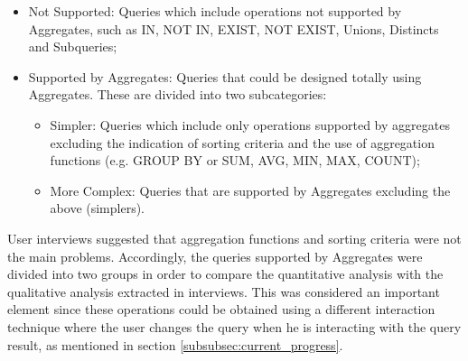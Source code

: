 \begin{itemize}
    \item Not Supported: Queries which include operations not supported by Aggregates, such as IN, NOT IN, EXIST, NOT EXIST, Unions, Distincts and Subqueries;
    \item Supported by Aggregates: Queries that could be designed totally using Aggregates. These are divided into two subcategories:
    \begin{itemize}
        \item Simpler: Queries which include only operations supported by aggregates excluding the indication of sorting criteria and the use of aggregation functions (e.g. GROUP BY or SUM, AVG, MIN, MAX, COUNT);
        \item More Complex: Queries that are supported by Aggregates excluding the above (simplers).
    \end{itemize}
\end{itemize}

User interviews suggested that aggregation functions and sorting criteria were not the main problems. Accordingly, the queries supported by Aggregates were divided into two groups in order to compare the quantitative analysis with the qualitative analysis extracted in interviews. This was considered an important element since these operations could be obtained using a different interaction technique where the user changes the query when he is interacting with the query result, as mentioned in section \ref{subsubsec:current_progress}. 

\begin{table}[tb]
	\caption{Queries that could be designed using Aggregates and the queries which the tool does not support}
	\label{tab:aggregates_supported_vs_not_supported_stats}
\centering
{}
\end{table}

